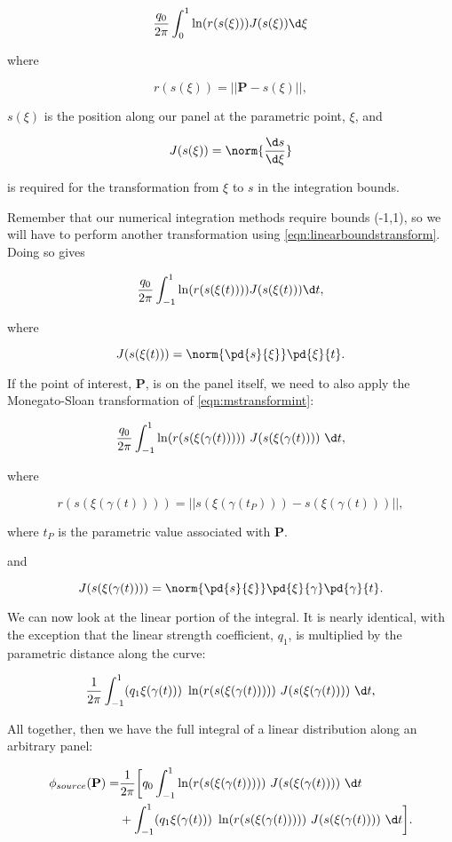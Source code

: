 \[ \frac{q_0}{2\pi} \int_0^1 \ln(r(s(\xi))) J(s(\xi)) \d\xi \]

\noindent where

\[ r(s(\xi)) = || \mathbf{P} - s(\xi) ||, \]

\noindent \(s(\xi)\) is the position along our panel at the parametric point, \(\xi\), and 

\[J(s(\xi)) = \norm{\frac{\d s}{\d\xi}}\] 

\noindent is required for the transformation from \(\xi\) to \(s\) in the integration bounds.

Remember that our numerical integration methods require bounds (-1,1), so we will have to perform another transformation using \cref{eqn:linearboundstransform}.
Doing so gives

\[ \frac{q_0}{2\pi} \int_{-1}^1 \ln(r(s(\xi(t)))) J(s(\xi(t))) \d t, \]

\noindent where

\[J(s(\xi(t))) = \norm{\pd{ s}{ \xi}} \pd{ \xi}{ t} .\]

\noindent If the point of interest, \(\mathbf{P}\), is on the panel itself, we need to also apply the Monegato-Sloan transformation of \cref{eqn:mstransformint}:

\[ \frac{q_0}{2\pi} \int_{-1}^1 \ln(r(s(\xi(\gamma(t))))) ~J(s(\xi(\gamma(t)))) ~\d t, \]

\noindent where

\[ r(s(\xi(\gamma(t)))) = || s(\xi(\gamma(t_P))) - s(\xi(\gamma(t))) ||, \]

\noindent where \(t_P\) is the parametric value associated with \(\mathbf{P}\).

\noindent and

\[J(s(\xi(\gamma(t)))) = \norm{\pd{ s}{ \xi}} \pd{ \xi}{ \gamma} \pd{ \gamma}{ t}  .\]

We can now look at the linear portion of the integral.  It is nearly identical, with the exception that the linear strength coefficient, \(q_1\), is multiplied by the parametric distance along the curve:

\[ \frac{1}{2\pi} \int_{-1}^1 (q_1\xi(\gamma(t))) ~\ln(r(s(\xi(\gamma(t))))) ~J(s(\xi(\gamma(t)))) ~\d t, \]

\noindent All together, then we have the full integral of a linear distribution along an arbitrary panel:

\[
\begin{split}
	\phi_{source}(\mathbf{P}) =& \frac{1}{2\pi} \biggr[
	q_0 \int_{-1}^1 \ln(r(s(\xi(\gamma(t))))) ~J(s(\xi(\gamma(t)))) ~\d t \\
	&+ \int_{-1}^1 (q_1\xi(\gamma(t))) ~\ln(r(s(\xi(\gamma(t))))) ~J(s(\xi(\gamma(t)))) ~\d t \biggr].
\end{split}
\]

